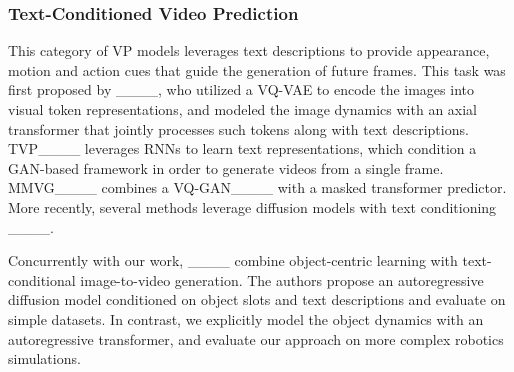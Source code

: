 \subsubsection{Text-Conditioned Video Prediction}
%
This category of VP models leverages text descriptions to provide appearance, motion and action cues that guide the generation of future frames.
%
This task was first proposed by ____, who utilized a VQ-VAE to encode the images into visual token representations, and modeled the image dynamics with an axial transformer that jointly processes such tokens along with text descriptions.
%
TVP____ leverages RNNs to learn text representations, which condition a GAN-based framework in order to generate videos from a single frame.
%
MMVG____ combines a VQ-GAN____ with a masked transformer predictor.
%
More recently, several methods leverage diffusion models with text conditioning ____.

Concurrently with our work, ____ combine object-centric learning with text-conditional image-to-video generation.
%
The authors propose an autoregressive diffusion model conditioned on object slots and text descriptions and evaluate on simple datasets.
%
In contrast, we explicitly model the object dynamics with an autoregressive transformer, and evaluate our approach on more complex robotics simulations.
